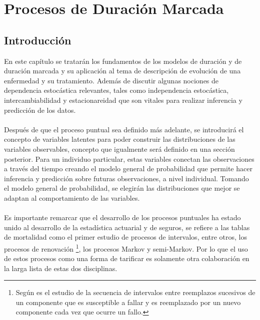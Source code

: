 \chapter{Procesos de Duraci\'on Marcada}
\section{Introducci\'on}
En este cap\'itulo se tratar\'an los fundamentos de los modelos de duraci\'on y de duraci\'on marcada y su aplicaci\'on al tema de descripci\'on de evoluci\'on de una enfermedad y su tratamiento. Adem\'as de discutir algunas nociones de dependencia estoc\'astica relevantes, tales como independencia estoc\'astica, intercambiabilidad y estacionareidad que son vitales para realizar inferencia y predicci\'on de los datos.\\
\\
Despu\'es de que el proceso puntual sea definido m\'as adelante, se introducir\'a el concepto de variables latentes para poder construir las distribuciones de las variables observables, concepto que igualmente ser\'a definido en una secci\'on posterior. Para un individuo particular, estas variables conectan las observaciones a trav\'es del tiempo creando el modelo general de probabilidad que permite hacer inferencia y predicci\'on sobre futuras observaciones, a nivel individual. Tomando el modelo general de probabilidad, se elegir\'an las distribuciones que mejor se adaptan al comportamiento de las variables.\\
\\
Es importante remarcar que el desarrollo de los procesos puntuales ha estado unido al desarrollo de la estad\'istica actuarial y de seguros, \cite{daley2003} se refiere a las tablas de mortalidad como el primer estudio de procesos de intervalos, entre otros, los procesos de renovaci\'on \footnote{Seg\'un \cite{daley2003} es el estudio de la secuencia de intervalos entre reemplazos sucesivos de un componente que es susceptible a fallar y es reemplazado por un nuevo componente cada vez que ocurre un fallo.}, los procesos Markov y semi-Markov. Por lo que el uso de estos procesos como una forma de tarificar es solamente otra colaboraci\'on en la larga lista de estas dos disciplinas.
\\
